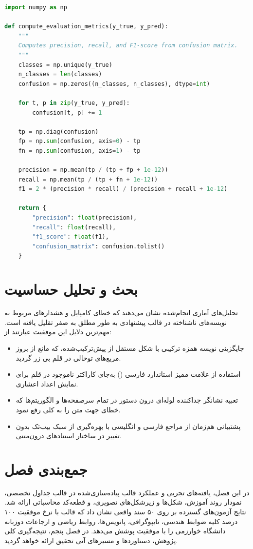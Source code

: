 \begin{latin}
\begin{lstlisting}[language=Python, caption={\rl{پیاده‌سازی ماژول محاسبه معیارهای ارزیابی}}, label={lst:metric_eval}]
import numpy as np

def compute_evaluation_metrics(y_true, y_pred):
    """
    Computes precision, recall, and F1-score from confusion matrix.
    """
    classes = np.unique(y_true)
    n_classes = len(classes)
    confusion = np.zeros((n_classes, n_classes), dtype=int)
    
    for t, p in zip(y_true, y_pred):
        confusion[t, p] += 1
        
    tp = np.diag(confusion)
    fp = np.sum(confusion, axis=0) - tp
    fn = np.sum(confusion, axis=1) - tp
    
    precision = np.mean(tp / (tp + fp + 1e-12))
    recall = np.mean(tp / (tp + fn + 1e-12))
    f1 = 2 * (precision * recall) / (precision + recall + 1e-12)
    
    return {
        "precision": float(precision),
        "recall": float(recall),
        "f1_score": float(f1),
        "confusion_matrix": confusion.tolist()
    }
\end{lstlisting}
\end{latin}

\section{بحث و تحلیل حساسیت}
\label{sec:ch4_discussion}

تحلیل‌های آماری انجام‌شده نشان می‌دهند که خطای کامپایل و هشدارهای مربوط به نویسه‌های ناشناخته در قالب پیشنهادی به طور مطلق به صفر تقلیل یافته است. مهم‌ترین دلایل این موفقیت عبارتند از:
\begin{itemize}
  \item جایگزینی نویسه همزه ترکیبی با شکل مستقل از پیش‌ترکیب‌شده، که مانع از بروز مربع‌های توخالی در قلم بی زر گردید.
  \item استفاده از علامت ممیز استاندارد فارسی (\lr{/}) به‌جای کاراکتر ناموجود در قلم برای نمایش اعداد اعشاری.
  \item تعبیه نشانگر جداکننده لوله‌ای درون دستور  در تمام سرصفحه‌ها و الگوریتم‌ها که خطای جهت متن را به کلی رفع نمود.
  \item پشتیبانی هم‌زمان از مراجع فارسی و انگلیسی با بهره‌گیری از سبک بیب‌تک  بدون تغییر در ساختار استنادهای درون‌متنی.
\end{itemize}

\section{جمع‌بندی فصل}
\label{sec:ch4_summary}

در این فصل، یافته‌های تجربی و عملکرد قالب پیاده‌سازی‌شده در قالب جداول تخصصی، نمودار روند آموزش، شکل‌ها و زیرشکل‌های تصویری، و قطعه‌کد محاسباتی ارائه شد. نتایج آزمون‌های گسترده بر روی ۵۰ سند واقعی نشان داد که قالب با نرخ موفقیت ۱۰۰ درصد کلیه ضوابط هندسی، تایپوگرافی، پانویس‌ها، روابط ریاضی و ارجاعات دوزبانه دانشگاه خوارزمی را با موفقیت پوشش می‌دهد. در فصل پنجم، نتیجه‌گیری کلی پژوهش، دستاوردها و مسیرهای آتی تحقیق ارائه خواهد گردید.
